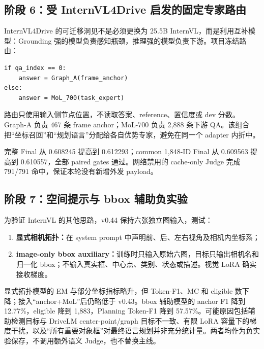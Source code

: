 \documentclass[UTF8,a4paper,11pt]{ctexart}
\begin{document}
\subsection{阶段 6：受 InternVL4Drive 启发的固定专家路由}
InternVL4Drive 的可迁移洞见不是必须更换为 25.5B InternVL，而是利用互补模型：Grounding 强的模型负责感知瓶颈，推理强的模型负责下游。项目冻结路由：
\begin{lstlisting}
if qa_index == 0:
    answer = Graph_A(frame_anchor)
else:
    answer = MoL_700(task_expert)
\end{lstlisting}
路由只使用输入侧节点位置，不读取答案、reference、置信度或 dev 分数。Graph-A 负责 467 条 frame anchor；MoL-700 负责 2,888 条下游 QA。该组合把“坐标召回”和“规划语言”分配给各自优势专家，避免在同一个 adapter 内折中。

完整 Final 从 0.608245 提高到 0.612293；common 1,848-ID Final 从 0.609563 提高到 0.610557，全部 paired gates 通过。网络禁用的 cache-only Judge 完成 791/791 命中，保证本轮没有新增外发 payload。

\subsection{阶段 7：空间提示与 bbox 辅助负实验}
为验证 InternVL 的其他思路，v0.44 保持六张独立图输入，测试：
\begin{enumerate}
  \item \textbf{显式相机拓扑：}在 system prompt 中声明前、后、左右视角及相机内坐标系；
  \item \textbf{image-only bbox auxiliary：}训练时只输入原始六图，目标只输出相机名和归一化 bbox；不输入真实框、中心点、类别、状态或描述。视觉 LoRA 确实接收梯度。
\end{enumerate}
显式拓扑模型的 EM 与部分坐标指标略升，但 Token-F1、MC 和 eligible 数下降；接入“anchor+MoL”后仍略低于 v0.43。bbox 辅助模型的 anchor F1 降到 12.77\%，eligible 降到 1,883，Planning Token-F1 降到 57.57\%。可能原因包括辅助检测目标与 DriveLM center-point/graph 目标不一致、有限 LoRA 容量下的梯度干扰，以及“所有重要对象框”对最终语言规划并非充分统计量。两者均作为负实验保存，不调用额外语义 Judge，也不替换主线。
\end{document}
